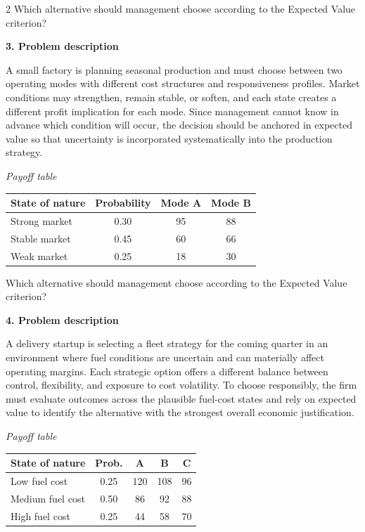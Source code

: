 \documentclass[12pt]{article}
\newcommand{\SubsectionBox}[1]{%
	\noindent\colorbox{gray!30}{%
		\parbox{\linewidth}{\textbf{#1}}%
	}\par\vspace{0.35cm}%
}
\begin{document}
\begin{multicols}{2}
				Which alternative should management choose according to the Expected Value criterion?

		\vspace{0.25cm}
		\SubsectionBox{3. Problem description}\vspace{-0.25cm}
		A small factory is planning seasonal production and must choose between two operating modes with different cost structures and responsiveness profiles. Market conditions may strengthen, remain stable, or soften, and each state creates a different profit implication for each mode. Since management cannot know in advance which condition will occur, the decision should be anchored in expected value so that uncertainty is incorporated systematically into the production strategy.
		
				\begin{center}
					\textit{Payoff table} \par
					\begin{tabular}{l c c c}
						\toprule
						State of nature & Probability & Mode A & Mode B \\
						\midrule
						Strong market & 0.30 & 95 & 88 \\
						Stable market & 0.45 & 60 & 66 \\
						Weak market & 0.25 & 18 & 30 \\
						\bottomrule
					\end{tabular}
				\end{center}
		
				Which alternative should management choose according to the Expected Value criterion?

		\vspace{0.25cm}
		\SubsectionBox{4. Problem description}\vspace{-0.25cm}
		A delivery startup is selecting a fleet strategy for the coming quarter in an environment where fuel conditions are uncertain and can materially affect operating margins. Each strategic option offers a different balance between control, flexibility, and exposure to cost volatility. To choose responsibly, the firm must evaluate outcomes across the plausible fuel-cost states and rely on expected value to identify the alternative with the strongest overall economic justification.
		
				\begin{center}
					\textit{Payoff table} \par
					\begin{tabular}{l c c c c}
						\toprule
						State of nature & Prob. & A & B & C \\
						\midrule
						Low fuel cost & 0.25 & 120 & 108 & 96 \\
						Medium fuel cost & 0.50 & 86 & 92 & 88 \\
						High fuel cost & 0.25 & 44 & 58 & 70 \\
						\bottomrule
					\end{tabular}
				\end{center}
		

\end{multicols}
\end{document}
